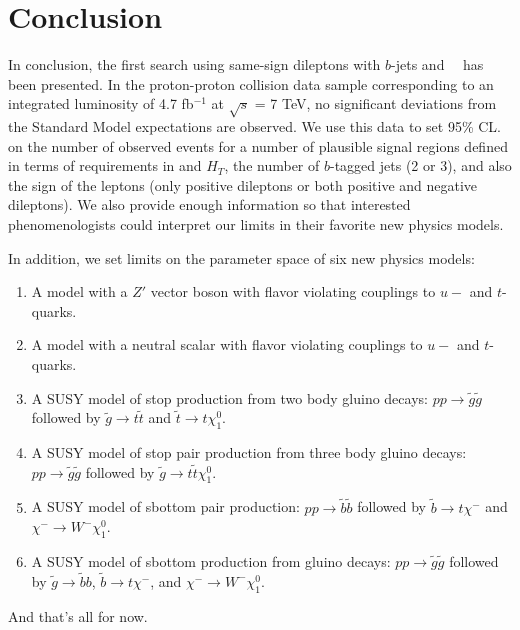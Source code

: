 \section{Conclusion}
\label{sec:conclusion}
In conclusion, the first search using same-sign dileptons with $b$-jets and \met~~has 
been presented. In the
proton-proton collision data sample corresponding to an integrated luminosity of 
 4.7 fb$^{-1}$ at $\sqrt{s}$ = 7 TeV,
no significant deviations from the Standard Model expectations are observed. 
We use this data to set 95\% CL. on the
number of observed events for a number of plausible signal regions
defined in terms of requirements in \met and $H_T$, the number of
$b$-tagged jets (2 or 3), and also the sign of the leptons (only positive dileptons
or both positive and negative dileptons).
We also provide enough information so that interested phenomenologists
could interpret our limits in their favorite new physics models.

In addition, we set limits on the parameter space of six new physics models:
\begin{enumerate}
\item A model with a $Z'$ vector boson with flavor violating couplings to $u-$ and $t$-quarks.

\item A model with a neutral scalar with flavor violating couplings to $u-$ and $t$-quarks.

\item A SUSY model of stop production from two body gluino decays: 
$pp \to \widetilde{g} \widetilde{g}$ followed by
$\widetilde{g} \to t\widetilde{t}$ and $\widetilde{t} \to t \chi_1^0$.

\item A SUSY model of stop pair production from three body gluino decays:
$pp \to \widetilde{g} \widetilde{g}$ followed by
$\widetilde{g} \to t\widetilde{t}\chi_1^0$.

\item A SUSY model of sbottom pair production: $pp \to \tilde{b}\tilde{b}$ followed
by $\tilde{b} \to t\chi^{-}$ and $\chi^{-} \to W^- \chi_1^0$.

\item A SUSY model of sbottom production from gluino decays:
$pp \to \widetilde{g} \widetilde{g}$ followed by
$\widetilde{g} \to \widetilde{b}b$,
$\widetilde{b} \to t\chi^-$, and $\chi^{-} \to W^- \chi_1^0$.
\end{enumerate}

And that's all for now.
